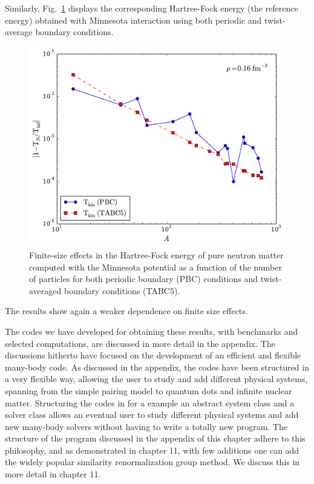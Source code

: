 Similarly, Fig.~\ref{fig:fig4} displays the corresponding Hartree-Fock energy (the reference energy) 
obtained with Minnesota interaction using both periodic and twist-average boundary conditions.  
  \begin{figure}
    \includegraphics[width=\linewidth]{Chapter8-figures/fig4.pdf}
    \caption{Finite-size effects in the Hartree-Fock energy of pure
      neutron matter computed with the Minnesota potential as a
      function of the number of particles for both periodic boundary (PBC)
      conditions and twist-averaged boundary conditions (TABC5).}
    \label{fig:fig4}
  \end{figure}
The results show again a weaker dependence on finite size effects.

The codes we have developed for obtaining these results, with
benchmarks and selected computations, are discussed in more detail in
the appendix.  The discussions hitherto have focused on the
development of an efficient and flexible many-body code. As discussed
in the appendix, the codes have been structured in a very flexible
way, allowing the user to study and add different physical systems,
spanning from the simple pairing model to quantum dots and infinite
nuclear matter. Structuring the codes in for a example an abstract
system class and a solver class allows an eventual user to study
different physical systems and add new many-body solvers without
having to write a totally new program. The structure of the program
discussed in the appendix of this chapter adhere to this philosophy, and as demonstrated in chapter 11, 
with few additions one can add 
the widely popular similarity renormalization group method. We discuss this in more detail in chapter 11. 

